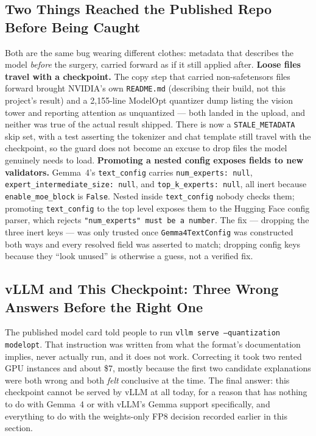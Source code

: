 \documentclass[11pt]{article}
\begin{document}
\subsection{Two Things Reached the Published Repo Before Being Caught}

Both are the same bug wearing different clothes: metadata that describes the model
\emph{before} the surgery, carried forward as if it still applied after. \textbf{Loose
files travel with a checkpoint.} The copy step that carried non-safetensors files
forward brought NVIDIA's own \texttt{README.md} (describing their build, not this
project's result) and a 2,155-line ModelOpt quantizer dump listing the vision tower and
reporting attention as unquantized --- both landed in the upload, and neither was true of
the actual result shipped. There is now a \texttt{STALE\_METADATA} skip set, with a test
asserting the tokenizer and chat template still travel with the checkpoint, so the guard
does not become an excuse to drop files the model genuinely needs to load.
\textbf{Promoting a nested config exposes fields to new validators.} Gemma~4's
\texttt{text\_config} carries \texttt{num\_experts: null},
\texttt{expert\_intermediate\_size: null}, and \texttt{top\_k\_experts: null}, all inert
because \texttt{enable\_moe\_block} is \texttt{False}. Nested inside \texttt{text\_config}
nobody checks them; promoting \texttt{text\_config} to the top level exposes them to the
Hugging Face config parser, which rejects \texttt{"num\_experts" must be a number}. The
fix --- dropping the three inert keys --- was only trusted once \texttt{Gemma4TextConfig}
was constructed both ways and every resolved field was asserted to match; dropping
config keys because they ``look unused'' is otherwise a guess, not a verified fix.

\subsection{vLLM and This Checkpoint: Three Wrong Answers Before the Right One}
\label{sec:gemma-vllm}

The published model card told people to run \texttt{vllm serve --quantization modelopt}.
That instruction was written from what the format's documentation implies, never
actually run, and it does not work. Correcting it took two rented GPU instances and
about \$7, mostly because the first two candidate explanations were both wrong and both
\emph{felt} conclusive at the time. The final answer: this checkpoint cannot be served
by vLLM at all today, for a reason that has nothing to do with Gemma~4 or with vLLM's
Gemma support specifically, and everything to do with the weights-only FP8 decision
recorded earlier in this section.
\end{document}
